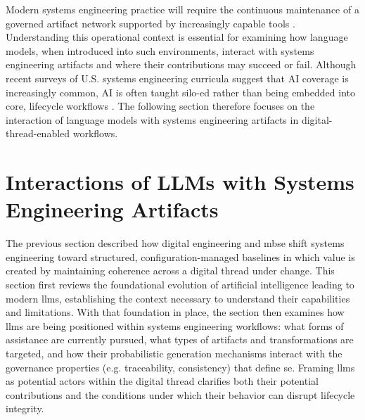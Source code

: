 Modern systems engineering practice will require the continuous maintenance of a governed artifact network supported by increasingly capable tools \cite{Adeyeye_AI_for_Systems_Engineering_2024}. Understanding this operational context is essential for examining how language models, when introduced into such environments, interact with systems engineering artifacts and where their contributions may succeed or fail. Although recent surveys of U.S. systems engineering curricula suggest that AI coverage is increasingly common, AI is often taught silo-ed rather than being embedded into core, lifecycle workflows \cite{Zhang_AI_Systems_Engineering_Education_Curricula_Training_US_2025}. The following section therefore focuses on the interaction of language models with systems engineering artifacts in digital-thread-enabled workflows.



\section{Interactions of LLMs with Systems Engineering Artifacts}
\label{sec:ch2_llm_interaction}


The previous section described how digital engineering and \ac{mbse} shift systems engineering toward structured, configuration-managed baselines in which value is created by maintaining coherence across a digital thread under change. This section first reviews the foundational evolution of artificial intelligence leading to modern \acp{llm}, establishing the context necessary to understand their capabilities and limitations. With that foundation in place, the section then examines how \acp{llm} are being positioned within systems engineering workflows: what forms of assistance are currently pursued, what types of artifacts and transformations are targeted, and how their probabilistic generation mechanisms interact with the governance properties (e.g. traceability, consistency) that define \ac{se}. Framing \acp{llm} as potential actors within the digital thread clarifies both their potential contributions and the conditions under which their behavior can disrupt lifecycle integrity. 


